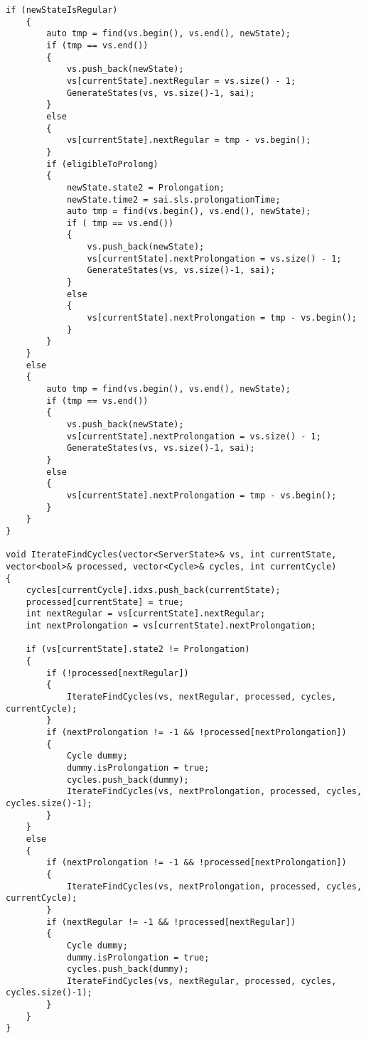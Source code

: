 \begin{lstlisting}[language={[ISO]C++}]
    if (newStateIsRegular)
    {
        auto tmp = find(vs.begin(), vs.end(), newState);
        if (tmp == vs.end())
        {
            vs.push_back(newState);
            vs[currentState].nextRegular = vs.size() - 1;
            GenerateStates(vs, vs.size()-1, sai);
        }
        else
        {
            vs[currentState].nextRegular = tmp - vs.begin();
        }
        if (eligibleToProlong)
        {
            newState.state2 = Prolongation;
            newState.time2 = sai.sls.prolongationTime;
            auto tmp = find(vs.begin(), vs.end(), newState);
            if ( tmp == vs.end())
            {
                vs.push_back(newState);
                vs[currentState].nextProlongation = vs.size() - 1;
                GenerateStates(vs, vs.size()-1, sai);
            }
            else
            {
                vs[currentState].nextProlongation = tmp - vs.begin();
            }
        }
    }
    else
    {
        auto tmp = find(vs.begin(), vs.end(), newState);
        if (tmp == vs.end())
        {
            vs.push_back(newState);
            vs[currentState].nextProlongation = vs.size() - 1;
            GenerateStates(vs, vs.size()-1, sai);
        }
        else
        {
            vs[currentState].nextProlongation = tmp - vs.begin();
        }
    }
}

void IterateFindCycles(vector<ServerState>& vs, int currentState, vector<bool>& processed, vector<Cycle>& cycles, int currentCycle)
{
    cycles[currentCycle].idxs.push_back(currentState);
    processed[currentState] = true;
    int nextRegular = vs[currentState].nextRegular;
    int nextProlongation = vs[currentState].nextProlongation;

    if (vs[currentState].state2 != Prolongation)
    {
        if (!processed[nextRegular])
      	{
            IterateFindCycles(vs, nextRegular, processed, cycles, currentCycle);
      	}
        if (nextProlongation != -1 && !processed[nextProlongation])
      	{
            Cycle dummy;
            dummy.isProlongation = true;
            cycles.push_back(dummy);
            IterateFindCycles(vs, nextProlongation, processed, cycles, cycles.size()-1);
      	}
    }
    else
    {
        if (nextProlongation != -1 && !processed[nextProlongation])
      	{
            IterateFindCycles(vs, nextProlongation, processed, cycles, currentCycle);
      	}
        if (nextRegular != -1 && !processed[nextRegular])
      	{
            Cycle dummy;
            dummy.isProlongation = true;
            cycles.push_back(dummy);
            IterateFindCycles(vs, nextRegular, processed, cycles, cycles.size()-1);
      	}
    }
}


\end{lstlisting}
